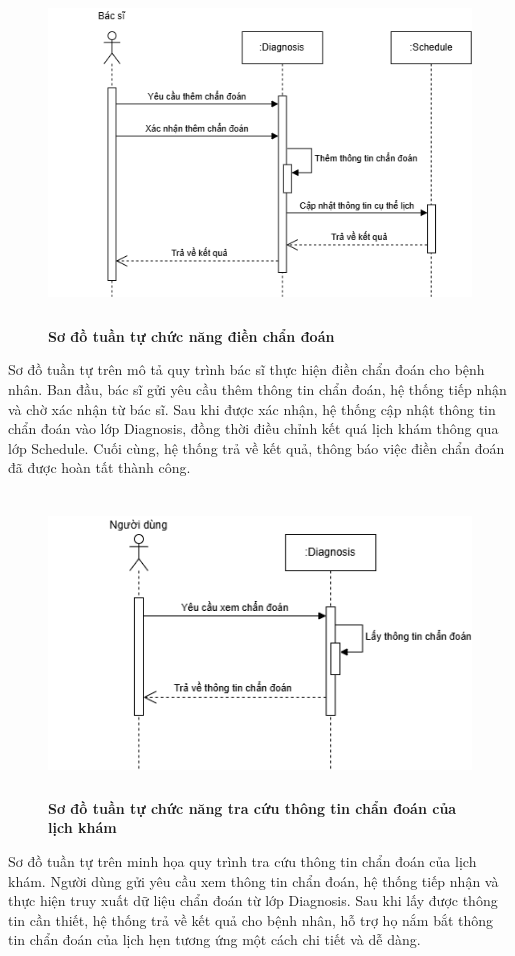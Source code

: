 \begin{figure}[H]
	\centering
	\includegraphics[width=11.5cm,height=9cm]{Images/sequence/diagnosis/create.drawio.png}
	\caption[Sơ đồ tuần tự chức năng điền chẩn đoán]{\bfseries \fontsize{12pt}{0pt}
		\selectfont Sơ đồ tuần tự chức năng điền chẩn đoán}
	\label{sequence_create_diag} %
\end{figure}
Sơ đồ tuần tự trên mô tả quy trình bác sĩ thực hiện điền chẩn đoán cho bệnh nhân. Ban đầu, bác sĩ gửi yêu cầu thêm thông tin chẩn đoán, hệ thống tiếp nhận và chờ xác nhận từ bác sĩ.
Sau khi được xác nhận, hệ thống cập nhật thông tin chẩn đoán vào lớp Diagnosis, đồng thời điều chỉnh kết quá lịch khám thông qua lớp Schedule.
Cuối cùng, hệ thống trả về kết quả, thông báo việc điền chẩn đoán đã được hoàn tất thành công.

\begin{figure}[H]
	\centering
	\includegraphics[width=12.5cm,height=8cm]{Images/sequence/diagnosis/getByScheduleId.drawio.png}
	\caption[Sơ đồ tuần tự chức năng tra cứu thông tin chẩn đoán của lịch khám]{\bfseries \fontsize{12pt}{0pt}
		\selectfont Sơ đồ tuần tự chức năng tra cứu thông tin chẩn đoán của lịch khám}
	\label{sequence_get} %
\end{figure}
Sơ đồ tuần tự trên minh họa quy trình tra cứu thông tin chẩn đoán của lịch khám. Người dùng gửi yêu cầu xem thông tin chẩn đoán, hệ thống tiếp nhận và thực hiện truy xuất dữ liệu chẩn đoán từ lớp Diagnosis.
Sau khi lấy được thông tin cần thiết, hệ thống trả về kết quả cho bệnh nhân, hỗ trợ họ nắm bắt thông tin chẩn đoán của lịch hẹn tương ứng một cách chi tiết và dễ dàng.


